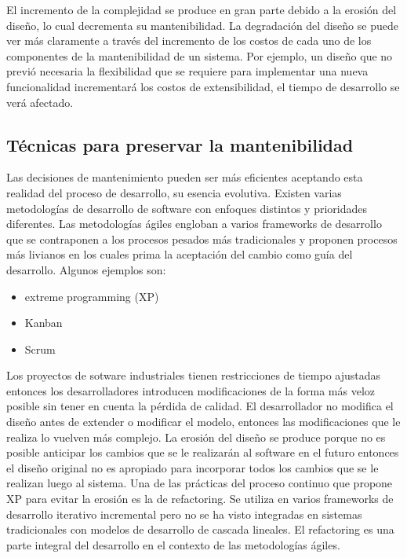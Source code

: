 El incremento de la complejidad se produce en gran parte debido a la erosión del diseño, lo cual
decrementa su mantenibilidad. La degradación del diseño se puede ver más claramente a través del
incremento de los costos de cada uno de los componentes de la mantenibilidad de un sistema. Por ejemplo,
un diseño que no previó necesaria la flexibilidad que se requiere para implementar una nueva funcionalidad
incrementará los costos de extensibilidad, el tiempo de desarrollo se verá afectado.


\subsection{Técnicas para preservar la mantenibilidad}

Las decisiones de mantenimiento pueden ser más eficientes aceptando esta realidad del proceso de
desarrollo, su esencia evolutiva. Existen varias metodologías de desarrollo de software con enfoques
distintos y prioridades diferentes. Las metodologías ágiles engloban a varios frameworks de desarrollo
que se contraponen a los procesos pesados más tradicionales y proponen procesos más livianos en los
cuales prima la aceptación del cambio como guía del desarrollo. Algunos ejemplos son:

\begin{itemize}
    \item extreme programming (XP)
    \item Kanban
    \item Scrum
\end{itemize}

Los proyectos de sotware industriales tienen restricciones de tiempo ajustadas entonces los
desarrolladores introducen modificaciones de la forma más veloz posible sin tener en cuenta la
pérdida de calidad. El desarrollador no modifica el diseño antes de extender o modificar el modelo,
entonces las modificaciones que le realiza lo vuelven más complejo. La erosión del diseño se produce
porque no es posible anticipar los cambios que se le realizarán al software en el futuro entonces el
diseño original no es apropiado para incorporar todos los cambios que se le realizan luego al
sistema. 
Una de las prácticas del proceso continuo que propone XP para evitar la erosión es la de refactoring.
Se utiliza en varios frameworks de desarrollo iterativo incremental pero no se ha visto integradas en
sistemas tradicionales con modelos de desarrollo de cascada lineales. El refactoring es una parte
integral del desarrollo en el contexto de las metodologías ágiles.

